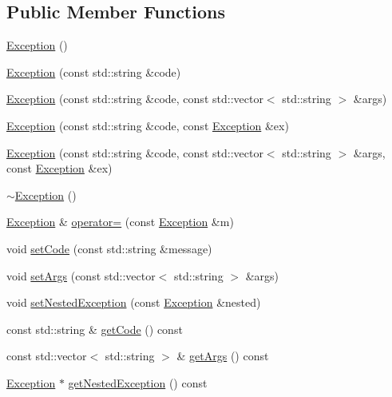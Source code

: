 \subsection*{Public Member Functions}
\begin{DoxyCompactItemize}
\item 
\hyperlink{classopen_mind_1_1exception_1_1_exception_a59823ca7f932d924e33b8ad5f630c1d7}{Exception} ()
\item 
\hyperlink{classopen_mind_1_1exception_1_1_exception_a67d2d4480a6760903b2e2e736614772d}{Exception} (const std\+::string \&code)
\item 
\hyperlink{classopen_mind_1_1exception_1_1_exception_a1323c0beeea120952fb2e3d13012d8ee}{Exception} (const std\+::string \&code, const std\+::vector$<$ std\+::string $>$ \&args)
\item 
\hyperlink{classopen_mind_1_1exception_1_1_exception_a902d97f9254055dc192be3d86703e80d}{Exception} (const std\+::string \&code, const \hyperlink{classopen_mind_1_1exception_1_1_exception}{Exception} \&ex)
\item 
\hyperlink{classopen_mind_1_1exception_1_1_exception_af8530c15d32bd09a0da3e3b72b6e5b74}{Exception} (const std\+::string \&code, const std\+::vector$<$ std\+::string $>$ \&args, const \hyperlink{classopen_mind_1_1exception_1_1_exception}{Exception} \&ex)
\item 
\hyperlink{classopen_mind_1_1exception_1_1_exception_a7ce9c64403e50a308a962a9237673f53}{$\sim$\+Exception} ()
\item 
\hyperlink{classopen_mind_1_1exception_1_1_exception}{Exception} \& \hyperlink{classopen_mind_1_1exception_1_1_exception_abd6e3d3f9e405c051de39739a67f5d2f}{operator=} (const \hyperlink{classopen_mind_1_1exception_1_1_exception}{Exception} \&m)
\item 
void \hyperlink{classopen_mind_1_1exception_1_1_exception_a94d6fc1829e741366f10b06e82c986d1}{set\+Code} (const std\+::string \&message)
\item 
void \hyperlink{classopen_mind_1_1exception_1_1_exception_a0f24ada4047f1d5bf4e82f25dbff6a5b}{set\+Args} (const std\+::vector$<$ std\+::string $>$ \&args)
\item 
void \hyperlink{classopen_mind_1_1exception_1_1_exception_ad41dfa3a0a9aeb6b600fea589cc42eaa}{set\+Nested\+Exception} (const \hyperlink{classopen_mind_1_1exception_1_1_exception}{Exception} \&nested)
\item 
const std\+::string \& \hyperlink{classopen_mind_1_1exception_1_1_exception_a1b6d36b99cf49cc173ee3e82231a15db}{get\+Code} () const 
\item 
const std\+::vector$<$ std\+::string $>$ \& \hyperlink{classopen_mind_1_1exception_1_1_exception_a0a0d952e5ac40133628e64829e8d4695}{get\+Args} () const 
\item 
\hyperlink{classopen_mind_1_1exception_1_1_exception}{Exception} $\ast$ \hyperlink{classopen_mind_1_1exception_1_1_exception_aa4a9a01bc42c659046bf2c1fd29c47df}{get\+Nested\+Exception} () const 
\end{DoxyCompactItemize}


